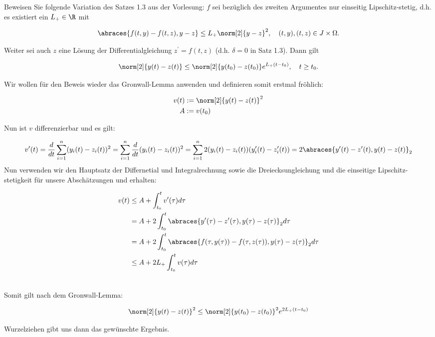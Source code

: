 \begin{exercise}

Beweisen Sie folgende Variation des Satzes 1.3 aus der Vorlesung:
$f$ sei bezüglich des zweiten Argumentes nur einseitig Lipschitz-stetig, d.h. es existiert ein $L_+ \in \R$ mit

\begin{align*}
  \abraces{f(t, y) - f(t, z), y - z}
  \leq
  L_+ \norm[2]{y - z}^2,
  \quad
  (t, y), (t, z) \in J \times \Omega.
\end{align*}

Weiter sei auch $z$ eine Lösung der Differentialgleichung $z^\prime = f(t, z)$ (d.h. $\delta = 0$ in Satz 1.3). Dann gilt

\begin{align*}
  \norm[2]{y(t) - z(t)}
  \leq
  \norm[2]{y(t_0) - z(t_0)} e^{L_+ (t - t_0)},
  \quad
  t \geq t_0.
\end{align*}

\end{exercise}

\begin{solution}

Wir wollen für den Beweis wieder das Gronwall-Lemma anwenden und definieren somit erstmal fröhlich:

\begin{align*}
  v(t)&:= \norm[2]{y(t)-z(t)}^{2}\\
  A &:= v(t_{0})
\end{align*}

Nun ist $v$ differenzierbar und es gilt:

\begin{align*}
  v'(t)=\frac{d}{dt}\sum_{i=1}^{n} (y_{i}(t)-z_{i}(t))^{2} =\sum_{i=1}^{n} \frac{d}{dt} (y_{i}(t)-z_{i}(t))^{2} =
  \sum_{i=1}^{n} 2(y_{i}(t)-z_{i}(t))(y'_{i}(t)-z'_{i}(t)) = 2 \abraces{y'(t)-z'(t),y(t)-z(t)}_2
\end{align*}
Nun verwenden wir den Hauptsatz der Differnetial und Integralrechnung sowie die Dreiecksungleichung und die einseitige
Lipschitz-stetigkeit für unsere Abschätzungen und erhalten:

\begin{align*}
  v(t) &\leq A + \int_{t_0}^{t} v'(\tau)d\tau \\
  &= A + 2\int_{t_0}^{t}\abraces{y'(\tau)-z'(\tau),y(\tau)-z(\tau)}_2d\tau \\
  &= A + 2\int_{t_0}^{t}\abraces{f(\tau,y(\tau))-f(\tau,z(\tau)),y(\tau)-z(\tau)}_2d\tau \\
  &\leq A +2L_{+}\int_{t_0}^tv(\tau)d\tau \\
  &\end{align*}

Somit gilt nach dem Gronwall-Lemma:

\begin{align*}
  \norm[2]{y(t)-z(t)}^{2} \leq \norm[2]{y(t_{0})-z(t_{0})}^{2}e^{2L_{+}(t-t_{0})}
\end{align*}

Wurzelziehen gibt uns dann das gewünschte Ergebnis.
\end{solution}
